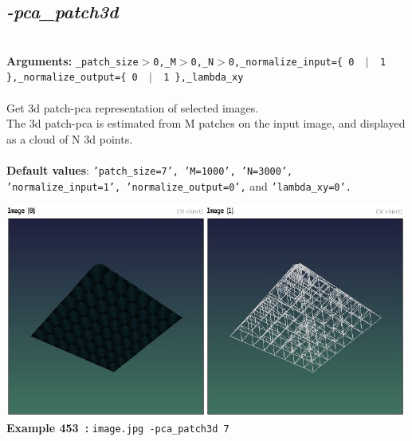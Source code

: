 \documentclass[a4paper,11pt,twoside]{book}
\begin{document}
\subsection{\emph{-pca\_patch3d} }\vspace*{-0.5em}
~\\\textbf{Arguments: } 
{\small \texttt{\_patch\_size$>$0,\_M$>$0,\_N$>$0,\_normalize\_input=\{ 0 ~$|$~ 1 \},\_normalize\_output=\{ 0 ~$|$~ 1 \},\_lambda\_xy}}\\~\\
Get 3d patch-pca representation of selected images.
~\\The 3d patch-pca is estimated from M patches on the input image, and displayed as a cloud of N 3d points.
~\\~\\\textbf{Default values}: {\small \texttt{'patch\_size=7', 'M=1000', 'N=3000', 'normalize\_input=1', 'normalize\_output=0',} and \texttt{'lambda\_xy=0'.}}
\begin{center}\includegraphics[keepaspectratio=true,height=7cm,width=\textwidth]{img/gmic_def453.jpg}\\
{\footnotesize \textbf{Example 453~:} \texttt{image.jpg -pca\_patch3d 7}}
\end{center}
\end{document}
